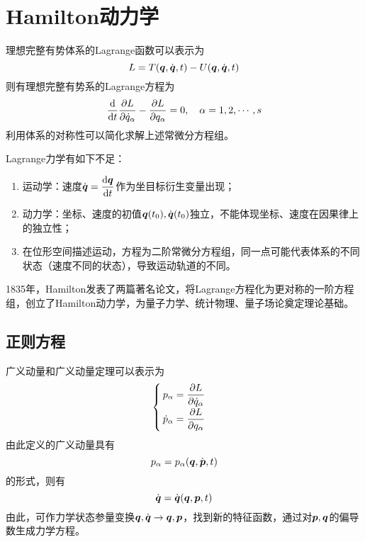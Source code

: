 \chapter{Hamilton动力学}

理想完整有势体系的Lagrange函数可以表示为
\begin{equation*}
	L = T(\boldsymbol{q},\dot{\boldsymbol{q}},t) - U(\boldsymbol{q},\dot{\boldsymbol{q}},t)
\end{equation*}
则有理想完整有势系的Lagrange方程为
\begin{equation*}
	\frac{\mathrm{d}}{\mathrm{d} t} \frac{\partial L}{\partial \dot{q}_\alpha} - \frac{\partial L}{\partial q_\alpha} = 0,\quad \alpha = 1,2,\cdots,s
\end{equation*}
利用体系的对称性可以简化求解上述常微分方程组。

Lagrange力学有如下不足：
\begin{enumerate}
	\item 运动学：速度$\dot{\boldsymbol{q}} = \dfrac{\mathrm{d} \boldsymbol{q}}{\mathrm{d} t}$作为坐目标衍生变量出现；
	\item 动力学：坐标、速度的初值$\boldsymbol{q}(t_0),\dot{\boldsymbol{q}}(t_0)$独立，不能体现坐标、速度在因果律上的独立性；
	\item 在位形空间描述运动，方程为二阶常微分方程组，同一点可能代表体系的不同状态（速度不同的状态），导致运动轨道的不同。
\end{enumerate}

1835年，Hamilton发表了两篇著名论文，将Lagrange方程化为更对称的一阶方程组，创立了Hamilton动力学，为量子力学、统计物理、量子场论奠定理论基础。

\section{正则方程}

广义动量和广义动量定理可以表示为
\begin{equation*}
	\begin{cases}
		\displaystyle p_\alpha = \frac{\partial L}{\partial \dot{q}_\alpha} \\[1.5ex]
		\displaystyle \dot{p}_\alpha = \frac{\partial L}{\partial q_\alpha}
	\end{cases}
\end{equation*}
由此定义的广义动量具有
\begin{equation*}
	p_\alpha = p_\alpha(\boldsymbol{q},\dot{\boldsymbol{p}},t)
\end{equation*}
的形式，则有
\begin{equation*}
	\dot{\boldsymbol{q}} = \dot{\boldsymbol{q}}(\boldsymbol{q},\boldsymbol{p},t)
\end{equation*}
由此，可作力学状态参量变换$\boldsymbol{q},\dot{\boldsymbol{q}} \to \boldsymbol{q},\boldsymbol{p}$，找到新的特征函数，通过对$\boldsymbol{p},\boldsymbol{q}$的偏导数生成力学方程。

